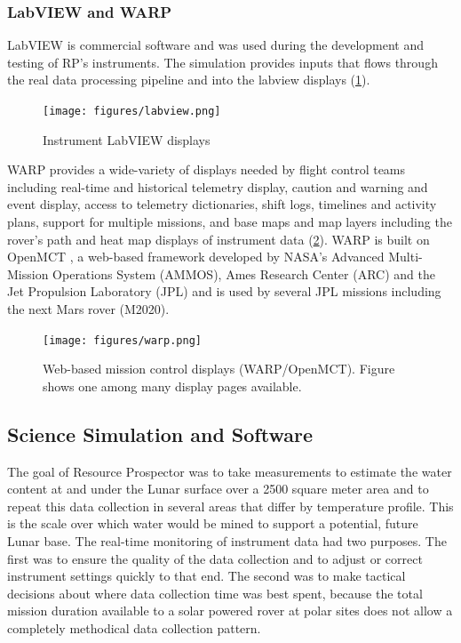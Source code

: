 \documentclass[twocolumn,letterpaper]{IEEEAerospaceCLS}  %
\begin{document}
\subsubsection{LabVIEW and WARP}

LabVIEW\cite{labview2018} is commercial software and was used during the development and testing of RP's instruments.
The simulation provides inputs that flows through the real data processing pipeline and into the labview displays (\cref{fig:labview}).

\begin{figure}[h!]
  \texttt{[image: figures/labview.png]}
  \caption{Instrument LabVIEW displays}
  \label{fig:labview}
\end{figure}

WARP \cite{trimble2016open} provides a wide-variety of displays needed by flight control teams including real-time and historical telemetry display, caution and warning and event display, access to telemetry dictionaries, shift logs, timelines and activity plans, support for multiple missions, and base maps and map layers including the rover's path and heat map displays of instrument data (\cref{fig:warp}).
WARP is built on OpenMCT \cite{OpenMCT}, a web-based framework developed by NASA’s Advanced Multi-Mission Operations System (AMMOS), Ames Research Center (ARC) and the Jet Propulsion Laboratory (JPL) and is used by several JPL missions including the next Mars rover (M2020).

\begin{figure}[h!]
  \texttt{[image: figures/warp.png]}
  \caption{Web-based mission control displays (WARP/OpenMCT).  Figure shows one among many display pages available.}
  \label{fig:warp}
\end{figure}

\subsection{Science Simulation and Software}

The goal of Resource Prospector was to take measurements to estimate the water content at and under the Lunar surface over a 2500 square meter area and to repeat this data collection in several areas that differ by temperature profile.  
This is the scale over which water would be mined to support a potential, future Lunar base.  
The real-time monitoring of instrument data had two purposes.  
The first was to ensure the quality of the data collection and to adjust or correct instrument settings quickly to that end.  
The second was to make tactical decisions about where data collection time was best spent, because the total mission duration available to a solar powered rover at polar sites does not allow a completely methodical data collection pattern.
\end{document}
